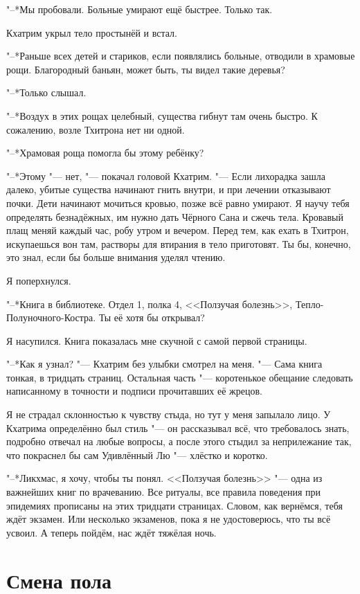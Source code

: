 \documentclass[a4paper,10pt,fleqn]{book}
\begin{document}
"--*Мы пробовали.
Больные умирают ещё быстрее.
Только так.

Кхатрим укрыл тело простынёй и встал.

"--*Раньше всех детей и стариков, если появлялись больные, отводили в храмовые рощи.
Благородный баньян, может быть, ты видел такие деревья?

"--*Только слышал.

"--*Воздух в этих рощах целебный, существа гибнут там очень быстро.
К сожалению, возле Тхитрона нет ни одной.

"--*Храмовая роща помогла бы этому ребёнку?

"--*Этому "--- нет, "--- покачал головой Кхатрим.
"--- Если лихорадка зашла далеко, убитые существа начинают гнить внутри, и при лечении отказывают почки.
Дети начинают мочиться кровью, позже всё равно умирают.
Я научу тебя определять безнадёжных, им нужно дать Чёрного Сана и сжечь тела.
Кровавый плащ меняй каждый час, робу утром и вечером.
Перед тем, как ехать в Тхитрон, искупаешься вон там, растворы для втирания в тело приготовят.
Ты бы, конечно, это знал, если бы больше внимания уделял чтению.

Я поперхнулся.

"--*Книга в библиотеке.
Отдел 1, полка 4, <<Ползучая болезнь>>, Тепло-Полуночного-Костра.
Ты её хотя бы открывал?

Я насупился.
Книга показалась мне скучной с самой первой страницы.

"--*Как я узнал? "--- Кхатрим без улыбки смотрел на меня.
"--- Сама книга тонкая, в тридцать страниц.
Остальная часть "--- коротенькое обещание следовать написанному в точности и подписи прочитавших её жрецов.

Я не страдал склонностью к чувству стыда, но тут у меня запылало лицо.
У Кхатрима определённо был стиль "--- он рассказывал всё, что требовалось знать, подробно отвечал на любые вопросы, а после этого стыдил за неприлежание так, что покраснел бы сам Удивлённый Лю "--- хлёстко и коротко.

"--*Ликхмас, я хочу, чтобы ты понял.
<<Ползучая болезнь>> "--- одна из важнейших книг по врачеванию.
Все ритуалы, все правила поведения при эпидемиях прописаны на этих тридцати страницах.
Словом, как вернёмся, тебя ждёт экзамен.
Или несколько экзаменов, пока я не удостоверюсь, что ты всё усвоил.
А теперь пойдём, нас ждёт тяжёлая ночь.

\section{Смена пола}
\end{document}
